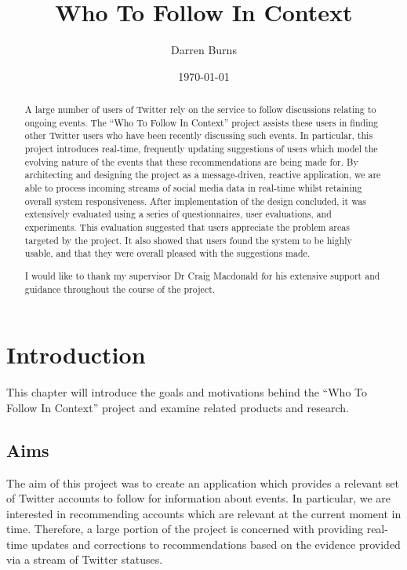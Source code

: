 \documentclass{l4proj}
\begin{document}
\title{Who To Follow In Context}
\author{Darren Burns}
\date{\today}
\maketitle

\begin{abstract}

A large number of users of Twitter rely on the service to follow discussions relating to ongoing events. The ``Who To Follow In Context'' project assists these users in finding other Twitter users who have been recently discussing such events. In particular, this project introduces real-time, frequently updating suggestions of users which model the evolving nature of the events that these recommendations are being made for. By architecting and designing the project as a message-driven, reactive application, we are able to process incoming streams of social media data in real-time whilst retaining overall system responsiveness. After implementation of the design concluded, it was extensively evaluated using a series of questionnaires, user evaluations, and experiments. This evaluation suggested that users appreciate the problem areas targeted by the project. It also showed that users found the system to be highly usable, and that they were overall pleased with the suggestions made.
\end{abstract}

\renewcommand{\abstractname}{Acknowledgements}
\begin{abstract}
I would like to thank my supervisor Dr Craig Macdonald for his extensive support and guidance throughout the course of the project.
\end{abstract}


\educationalconsent
%
%
\tableofcontents

\chapter{Introduction}

This chapter will introduce the goals and motivations behind the ``Who To Follow In Context'' project and examine related products and research.

\section{Aims}
The aim of this project was to create an application which provides a relevant set of Twitter accounts to follow for information about events. In particular, we are interested in recommending accounts which are relevant at the current moment in time. Therefore, a large portion of the project is concerned with providing real-time updates and corrections to recommendations based on the evidence provided via a stream of Twitter statuses.
\end{document}
